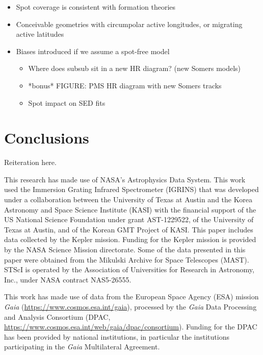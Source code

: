 \documentclass[twocolumn]{emulateapj}%
\begin{document}
\begin{itemize}
\item Spot coverage is consistent with formation theories
\item Conceivable geometries with circumpolar active longitudes, or migrating active latitudes
\item Biases introduced if we assume a spot-free model
\begin{itemize}
  \item Where does subsub sit in a new HR diagram? (new Somers models)
  \item *bonus* FIGURE: PMS HR diagram with new Somers tracks
  \item Spot impact on SED fits
\end{itemize}
\end{itemize}

\section{Conclusions}

Reiteration here.

\clearpage
\pagebreak



\acknowledgements

This research has made use of NASA’s Astrophysics Data System.
This work used the Immersion Grating Infrared Spectrometer (IGRINS) that was developed under a collaboration between the University of Texas at Austin and the Korea Astronomy and Space Science Institute (KASI) with the financial support of the US National Science Foundation under grant AST-1229522, of the University of Texas at Austin, and of the Korean GMT Project of KASI.
This paper includes data collected by the Kepler mission. Funding for the Kepler mission is provided by the NASA Science Mission directorate.
Some of the data presented in this paper were obtained from the Mikulski Archive for Space Telescopes (MAST). STScI is operated by the Association of Universities for Research in Astronomy, Inc., under NASA contract NAS5-26555.

This work has made use of data from the European Space Agency (ESA) mission
{\it Gaia} (\url{https://www.cosmos.esa.int/gaia}), processed by the {\it Gaia}
Data Processing and Analysis Consortium (DPAC,
\url{https://www.cosmos.esa.int/web/gaia/dpac/consortium}). Funding for the DPAC
has been provided by national institutions, in particular the institutions
participating in the {\it Gaia} Multilateral Agreement.
\end{document}
